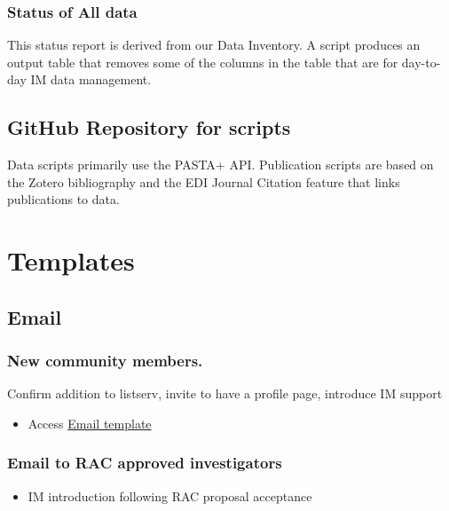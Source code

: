 \documentclass[
  letterpaper,
  DIV=11,
  numbers=noendperiod]{scrreprt}
\providecommand{\tightlist}{%
  \setlength{\itemsep}{0pt}\setlength{\parskip}{0pt}}\usepackage{longtable,booktabs,array}
\begin{document}
\subsection{Status of All data}\label{status-of-all-data}

This status report is derived from our Data Inventory. A script produces
an output table that removes some of the columns in the table that are
for day-to-day IM data management.

\section{GitHub Repository for
scripts}\label{github-repository-for-scripts}

Data scripts primarily use the PASTA+ API. Publication scripts are based
on the Zotero bibliography and the EDI Journal Citation feature that
links publications to data.


\chapter{Templates}\label{templates}

\section{Email}\label{email}

\subsection{New community members.}\label{new-community-members.}

Confirm addition to listserv, invite to have a profile page, introduce
IM support

\begin{itemize}
\tightlist
\item
  Access \href{Email_Welcome2HBR.qmd}{Email template}
\end{itemize}

\subsection{Email to RAC approved
investigators}\label{email-to-rac-approved-investigators}

\begin{itemize}
\tightlist
\item
  IM introduction following RAC proposal acceptance
\end{itemize}
\end{document}

